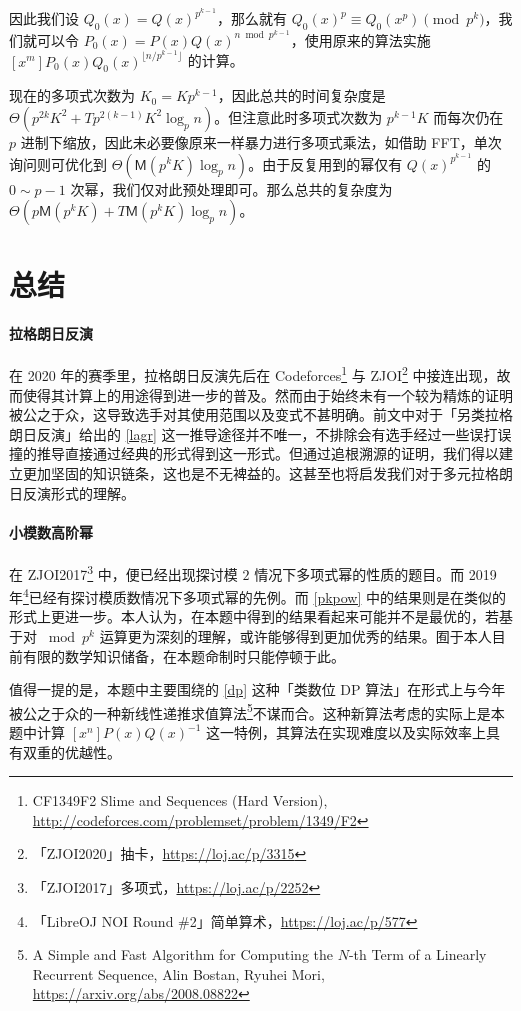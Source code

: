 \documentclass[12pt]{ctexart}
\newcommand{\Mul}{\ensuremath{\mathsf M}}
\theoremstyle{theorem}
\theoremstyle{theorem}
\begin{document}
因此我们设 $Q_0(x) = Q(x)^{p^{k-1}}$，那么就有 $Q_0(x)^p \equiv Q_0(x^p) \pmod {p^k}$，我们就可以令 $P_0(x)=P(x)Q(x)^{n\bmod p^{k-1}}$，使用原来的算法实施 $[x^m]P_0(x)Q_0(x)^{\lfloor n/p^{k-1} \rfloor}$ 的计算。

现在的多项式次数为 $K_0 = Kp^{k-1}$，因此总共的时间复杂度是 $\Theta(p^{2k}K^2 + Tp^{2(k-1)}K^2 \log_p n)$。但注意此时多项式次数为 $p^{k-1}K$ 而每次仍在 $p$ 进制下缩放，因此未必要像原来一样暴力进行多项式乘法，如借助 FFT，单次询问则可优化到 $\Theta(\Mul(p^k K)\log_p n)$。由于反复用到的幂仅有 $Q(x)^{p^{k-1}}$ 的 $0\sim p-1$ 次幂，我们仅对此预处理即可。那么总共的复杂度为 $\Theta(p\Mul(p^k K) + T\Mul(p^k K)\log_p n)$。

\newpage

\section{总结}

\paragraph{拉格朗日反演} 在 2020 年的赛季里，拉格朗日反演先后在 Codeforces\footnote{CF1349F2 Slime and Sequences (Hard Version), \url{http://codeforces.com/problemset/problem/1349/F2}} 与 ZJOI\footnote{「ZJOI2020」抽卡，\url{https://loj.ac/p/3315}} 中接连出现，故而使得其计算上的用途得到进一步的普及。然而由于始终未有一个较为精炼的证明被公之于众，这导致选手对其使用范围以及变式不甚明确。前文中对于「另类拉格朗日反演」给出的 \ref{lagr} 这一推导途径并不唯一，不排除会有选手经过一些误打误撞的推导直接通过经典的形式得到这一形式。但通过追根溯源的证明，我们得以建立更加坚固的知识链条，这也是不无裨益的。这甚至也将启发我们对于多元拉格朗日反演形式的理解。

\paragraph{小模数高阶幂} 在 ZJOI2017\footnote{「ZJOI2017」多项式，\url{https://loj.ac/p/2252}} 中，便已经出现探讨模 $2$ 情况下多项式幂的性质的题目。而 2019 年\footnote{「LibreOJ NOI Round \#2」简单算术，\url{https://loj.ac/p/577}}已经有探讨模质数情况下多项式幂的先例。而 \ref{pkpow} 中的结果则是在类似的形式上更进一步。本人认为，在本题中得到的结果看起来可能并不是最优的，若基于对 $\bmod p^k$ 运算更为深刻的理解，或许能够得到更加优秀的结果。囿于本人目前有限的数学知识储备，在本题命制时只能停顿于此。

值得一提的是，本题中主要围绕的 \ref{dp} 这种「类数位 DP 算法」在形式上与今年被公之于众的一种新线性递推求值算法\footnote{A Simple and Fast Algorithm for Computing the $N$-th Term of a Linearly Recurrent Sequence, Alin Bostan, Ryuhei Mori, \url{https://arxiv.org/abs/2008.08822}}不谋而合。这种新算法考虑的实际上是本题中计算 $[x^n]P(x)Q(x)^{-1}$ 这一特例，其算法在实现难度以及实际效率上具有双重的优越性。
\end{document}
